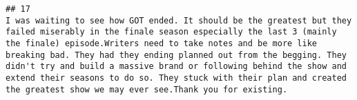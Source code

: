\documentclass[
]{article}
\begin{document}
\begin{verbatim}
## 17                                                                                                                                                                                                                                                                                                                                                                                                                                                                                                                                                                                                                                                                                                                                                                                                                                                                                                                                                                                                                                                                                                                                                                                                                                                                                                                                                                                                                                                                                                                                                                                                                                                                                                                           I was waiting to see how GOT ended. It should be the greatest but they failed miserably in the finale season especially the last 3 (mainly the finale) episode.Writers need to take notes and be more like breaking bad. They had they ending planned out from the begging. They didn't try and build a massive brand or following behind the show and extend their seasons to do so. They stuck with their plan and created the greatest show we may ever see.Thank you for existing.

\end{verbatim}
\end{document}
